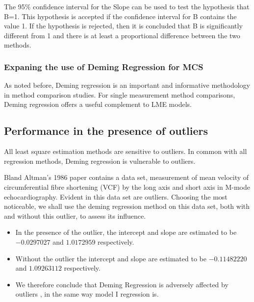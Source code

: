 \documentclass[12pt, a4paper]{report}
\theoremstyle{plain}
\theoremstyle{definition}
\theoremstyle{remark}
\begin{document}
	The 95\% confidence interval for the Slope can be used to test the hypothesis that B=1. This hypothesis is accepted if the confidence interval for B contains the value 1. If the hypothesis is rejected, then it is concluded that B is significantly different from 1 and there is at least a proportional difference between the two methods.
	
	
	
	
	
	
	\subsubsection{Expaning the use of Deming Regression for MCS}
	As noted before, Deming regression is an important and informative methodology in method comparison studies.
	For single measurement method comparisons, Deming regression offers a useful complement to LME models.
	
	
	
	
	
	
	
	
	
	
	
	
	\subsection{Performance in the presence of outliers}
	All least square estimation methods are sensitive to outliers.
	In common with all regression methods, Deming regression is vulnerable to outliers. 
	
	Bland Altman's 1986 paper contains a data set, measurement of mean velocity of circumferential fibre shortening (VCF) by the long axis and short axis in M-mode echocardiography. Evident in this data set are outliers. Choosing the most noticeable, we shall use the deming regression method on this data set, both with and
	without this outlier, to assess its influence.
	\begin{itemize}
		\item In the presence of the outlier, the intercept and slope are estimated to be $-0.0297027$ and $1.0172959$ respectively.
		\item Without the outlier the intercept and slope are estimated to be
		$-0.11482220$ and  $1.09263112$ respectively.
		\item We therefore conclude that Deming Regression is adversely affected
		by outliers , in the same way model I regression is.
	\end{itemize}
	
	
\end{document}
